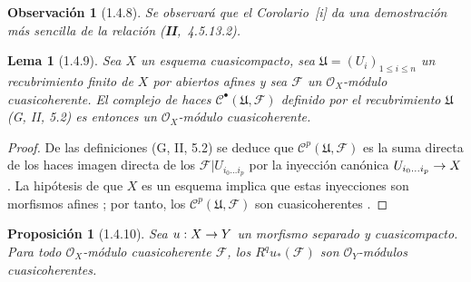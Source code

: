 \documentclass[10pt,oneside,openany]{book}
\theoremstyle{egaenv}\newtheorem*{env}{---}
\theoremstyle{egastatement}
\newtheorem*{proposition}{Proposición}
\newtheorem*{lemma}{Lema}
\theoremstyle{egadescription}
\newtheorem*{remark}{Observación}
\newcommand{\oldpage}[2][]{\marginnote{\normalfont\scriptsize\textbf{#1}\,|\,#2}\ignorespaces}
\renewcommand{\leq}{\leqslant}
\renewcommand{\to}{\mathchoice{\longrightarrow}{\rightarrow}{\rightarrow}{\rightarrow}}
\begin{document}
\begin{remark}[1.4.8]
\label{III.1.4.8}
\label{III.1.4.8-fr}
Se observará que el Corolario~[i] da una demostración más sencilla de la relación (\textbf{II},~4.5.13.2).
\end{remark}

\begin{lemma}[1.4.9]
\label{III.1.4.9}
\label{III.1.4.9-fr}
\oldpage[III]{91}
Sea $X$ un esquema cuasicompacto, sea $\mathfrak U=(U_i)_{1\leq i\leq n}$ un recubrimiento finito de $X$ por abiertos afines y sea $\mathcal F$ un $\mathcal O_X$-módulo cuasicoherente.
El complejo de haces $\mathcal C^\bullet(\mathfrak U,\mathcal F)$ definido por el recubrimiento $\mathfrak U$ \textup{(G, II, 5.2)} es entonces un $\mathcal O_X$-módulo cuasicoherente.
\end{lemma}

\begin{proof}
De las definiciones (G, II, 5.2) se deduce que $\mathcal C^p(\mathfrak U,\mathcal F)$ es la suma directa de los haces imagen directa de los $\mathcal F\vert U_{i_0\ldots i_p}$ por la inyección canónica $U_{i_0\ldots i_p}\to X$.
La hipótesis de que $X$ es un esquema implica que estas inyecciones son morfismos afines ; por tanto, los $\mathcal C^p(\mathfrak U,\mathcal F)$ son cuasicoherentes .
\end{proof}

\begin{proposition}[1.4.10]
\label{III.1.4.10}
\label{III.1.4.10-fr}
Sea $u:X\to Y$ un morfismo separado y cuasicompacto.
Para todo $\mathcal O_X$-módulo cuasicoherente $\mathcal F$, los $R^qu_*(\mathcal F)$ son $\mathcal O_Y$-módulos cuasicoherentes.
\end{proposition}
\end{document}
